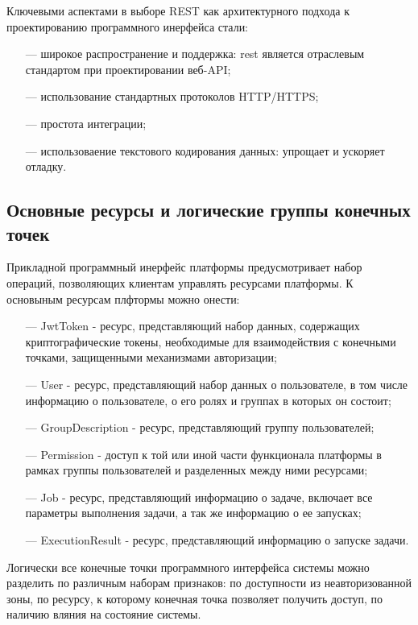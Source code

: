 Ключевыми аспектами в выборе REST как архитектурного подхода к проектированию программного инерфейса стали:

\begin{itemize}
  \item[---]широкое распространение и поддержка: rest является отраслевым стандартом при проектировании веб-API;
  \item[---]использование стандартных протоколов HTTP/HTTPS;
  \item[---]простота интеграции;
  \item[---]использоваение текстового кодирования данных: упрощает и ускоряет отладку. 
\end{itemize}

\subsection{Основные ресурсы и логические группы конечных точек}

Прикладной программный инерфейс платформы предусмотривает набор операций, позволяющих клиентам управлять ресурсами платформы.
К основыным ресурсам плфтормы можно онести:

\begin{itemize}
  \item[---]JwtToken - ресурс, представляющий набор данных, содержащих криптографические токены, необходимые для взаимодействия с конечными точками, защищенными механизмами авторизации;
  \item[---]User - ресурс, представляющий набор данных о пользователе, в том числе информацию о пользователе, о его ролях и группах в которых он состоит;
  \item[---]GroupDescription - ресурс, представляющий группу пользователей;
  \item[---]Permission - доступ к той или иной части функционала платформы в рамках группы пользователей и разделенных между ними ресурсами; 
  \item[---]Job - ресурс, представляющий информацию о задаче, включает все параметры выполнения задачи, а так же информацию о ее запусках;
  \item[---]ExecutionResult - ресурс, представляющий информацию о запуске задачи. 
\end{itemize}

Логически все конечные точки программного интерфейса системы можно разделить по различным наборам признаков: по доступности из неавторизованной зоны, по ресурсу, к которому конечная точка позволяет получить доступ, по наличию вляния на состояние системы.

